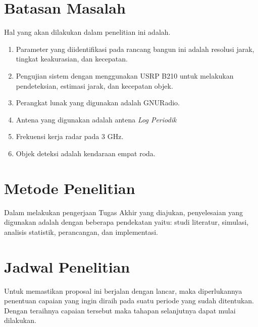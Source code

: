 \section{Batasan Masalah}
Hal yang akan dilakukan dalam penelitian ini adalah.
\begin{enumerate}
	\item Parameter yang diidentifikasi pada rancang bangun ini adalah resolusi jarak, tingkat keakurasian, dan kecepatan.
	\item Pengujian sistem dengan menggunakan USRP B210 untuk melakukan pendeteksian, estimasi jarak, dan kecepatan objek.
	\item Perangkat lunak yang digunakan adalah GNURadio.
	\item Antena yang digunakan adalah antena \textit{Log Periodik}
	\item Frekuensi kerja radar pada 3 GHz.
	\item Objek deteksi adalah kendaraan empat roda.
\end{enumerate}

\section{Metode Penelitian}
Dalam melakukan pengerjaan Tugas Akhir yang diajukan, penyelesaian yang digunakan adalah dengan beberapa pendekatan yaitu: studi literatur, simulasi, analisis statistik, perancangan, dan implementasi.

\section{Jadwal Penelitian}
Untuk memastikan proposal ini berjalan dengan lancar, maka diperlukannya penentuan capaian yang ingin diraih pada suatu periode yang sudah ditentukan. Dengan teraihnya capaian tersebut maka tahapan selanjutnya dapat mulai dilakukan.

